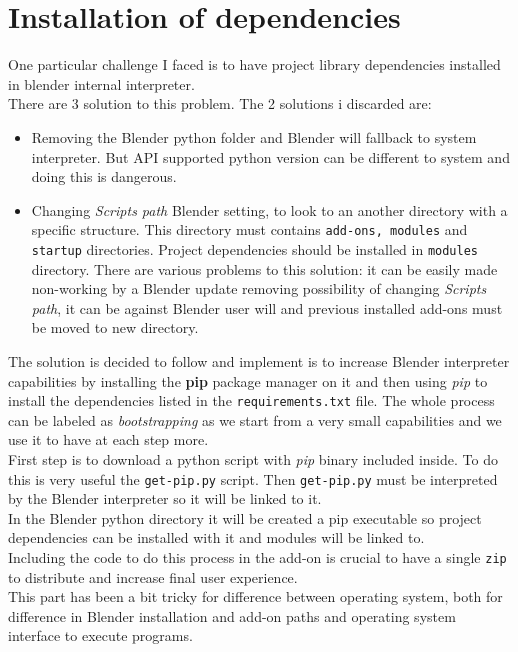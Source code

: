 \section{Installation of dependencies}
One particular challenge I faced is to have project library dependencies installed in blender internal interpreter. \\
There are 3 solution to this problem. The 2 solutions i discarded are: 
\begin{itemize}
\item Removing the Blender python folder and Blender will fallback to system interpreter. But API supported python version can be different to system and doing this is dangerous.
\item Changing \textit{Scripts path} Blender setting, to look to an another directory with a specific structure. This directory must contains \texttt{add-ons, modules} and \texttt{startup} directories. Project dependencies should be installed in \texttt{modules} directory. There are various problems to this solution: it can be easily made non-working by a Blender update removing possibility of changing \textit{Scripts path}, it can be against Blender user will and previous installed add-ons must be moved to new directory.
\end{itemize}
The solution is decided to follow and implement is to increase Blender interpreter capabilities by installing the \textbf{pip} package manager on it and then using \textit{pip} to install the dependencies listed in the \texttt{requirements.txt} file. The whole process can be labeled as \textit{bootstrapping} as we start from a very small capabilities and we use it to have at each step more. \\
First step is to download a python script with \textit{pip} binary included inside. To do this is very useful the \texttt{get-pip.py} script. \cite{get-pip}
Then \texttt{get-pip.py} must be interpreted by the Blender interpreter so it will be linked to it.  \\
In the Blender python directory it will be created a pip executable so project dependencies can be installed with it and modules will be linked to. \\
Including the code to do this process in the add-on is crucial to have a single \texttt{zip} to distribute and increase final user experience. \\
This part has been a bit tricky for difference between operating system, both for difference in Blender installation and add-on paths and operating system interface to execute programs. \\